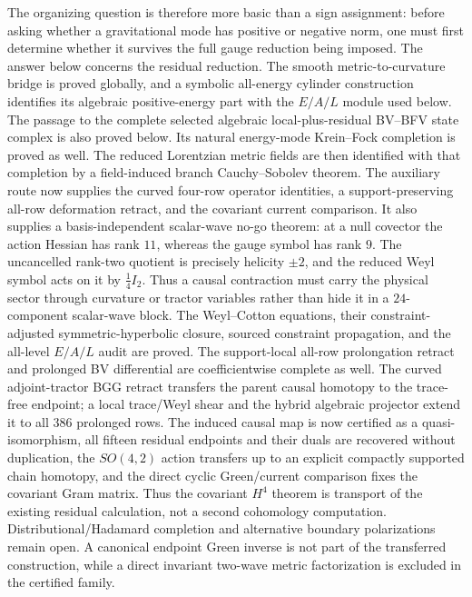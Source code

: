 \documentclass[11pt]{article}
\theoremstyle{definition}
\theoremstyle{remark}
\begin{document}
The organizing question is therefore more basic than a sign assignment:
before asking whether a gravitational mode has positive or negative norm,
one must first determine whether it survives the full gauge reduction being
imposed.  The answer below concerns the residual reduction.  The
smooth metric-to-curvature bridge is proved globally, and a symbolic
all-energy cylinder construction identifies its algebraic positive-energy
part with the $E/A/L$ module used below.  The passage to the complete
selected algebraic local-plus-residual BV--BFV state complex is also proved
below.  Its natural energy-mode Krein--Fock completion is proved as well.
The reduced Lorentzian metric fields are then identified with that
completion by a field-induced branch Cauchy--Sobolev theorem.  The auxiliary
route now supplies the curved four-row operator identities, a
support-preserving all-row deformation retract, and the covariant current
comparison.  It also supplies a basis-independent scalar-wave no-go theorem:
at a null covector the action Hessian has rank $11$, whereas the gauge symbol
has rank $9$.  The uncancelled rank-two quotient is precisely helicity
$\pm2$, and the reduced Weyl symbol acts on it by $\frac14 I_2$.  Thus a
causal contraction must carry the physical sector through curvature or
tractor variables rather than hide it in a $24$-component scalar-wave block.
The
  Weyl--Cotton equations, their constraint-adjusted symmetric-hyperbolic
  closure, sourced constraint propagation, and the all-level $E/A/L$ audit
  are proved.  The support-local all-row prolongation retract and prolonged
  BV differential are coefficientwise complete as well.  The curved adjoint-tractor BGG
  retract transfers the parent causal homotopy to the trace-free endpoint;
  a local trace/Weyl shear and the hybrid algebraic projector extend it to
  all $386$ prolonged rows.  The induced causal map is now certified as a
  quasi-isomorphism, all fifteen residual endpoints and their duals are
  recovered without duplication, the $SO(4,2)$ action transfers up to an
  explicit compactly supported chain homotopy, and the direct cyclic
  Green/current comparison fixes the covariant Gram matrix.  Thus the
  covariant $H^4$ theorem is transport of the existing residual calculation,
  not a second cohomology computation.  Distributional/Hadamard completion
  and alternative boundary polarizations remain open.  A canonical endpoint
  Green inverse is not part of the transferred construction, while a direct
  invariant two-wave metric factorization is excluded in the certified
  family.
\end{document}
